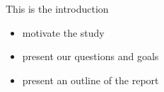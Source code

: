 This is the introduction
\begin{itemize}
\item motivate the study
\item present our questions and goals
\item present an outline of the report
\end{itemize}
